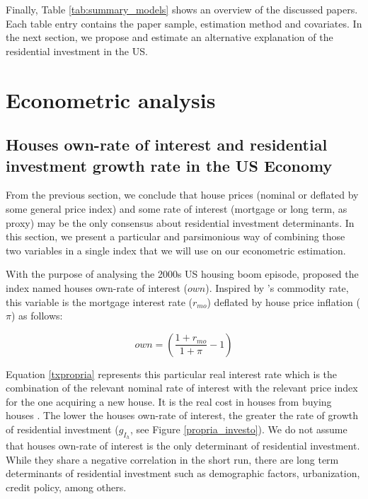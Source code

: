 \documentclass[12pt, a4paper]{article}
\begin{document}
Finally, Table \ref{tab:summary_models} shows an overview of the discussed papers.
Each table entry contains the paper sample, estimation method and covariates.
In the next section, we propose and estimate an alternative explanation of the residential investment in the US.




\section{Econometric analysis}
\label{sec:org78faef3}
\label{sec:VECM}
\subsection{Houses own-rate of interest and residential investment growth rate in the US Economy}
\label{sec:org21c4984}
\label{sec:own}

From the previous section, we conclude that house prices (nominal or deflated by some general price index) and some rate of interest (mortgage or long term, as proxy) may be the only consensus about residential investment determinants.
In this section, we present a particular and parsimonious way of combining those two variables  in a single index that we will use on our econometric estimation.


With the purpose of analysing the 2000s US housing boom episode, \textcite{teixeira_crescimento_2015}  proposed the index named houses own-rate of interest (\(own\)).
Inspired by \citeauthor*{sraffaDrHayekMoney1932}'s \citeyear{sraffaDrHayekMoney1932} commodity rate, this variable is the mortgage interest rate (\(r_{mo}\)) deflated by house price inflation (\(\pi\)) as follows:
\begin{latex}
\begin{equation}
\label{txpropria}
own =  \left(\frac{1+r_{mo}}{1+\pi} - 1\right)
\end{equation}
\end{latex}
Equation \ref{txpropria} represents this particular real interest rate which is the combination of the relevant nominal rate of interest with the relevant price index for the one acquiring a new house.
It is the real cost in houses from buying houses  \cite[p.~53]{teixeira_crescimento_2015}.
The lower the houses own-rate of interest, the greater the rate of growth of residential investment (\(g_{I_{h}}\), see Figure \ref{propria_investo}).
We do not assume that houses own-rate of interest is the only determinant of residential investment.
While they share a negative correlation in the short run, there are long term determinants of residential investment such as demographic factors, urbanization, credit policy, among others.
\end{document}
